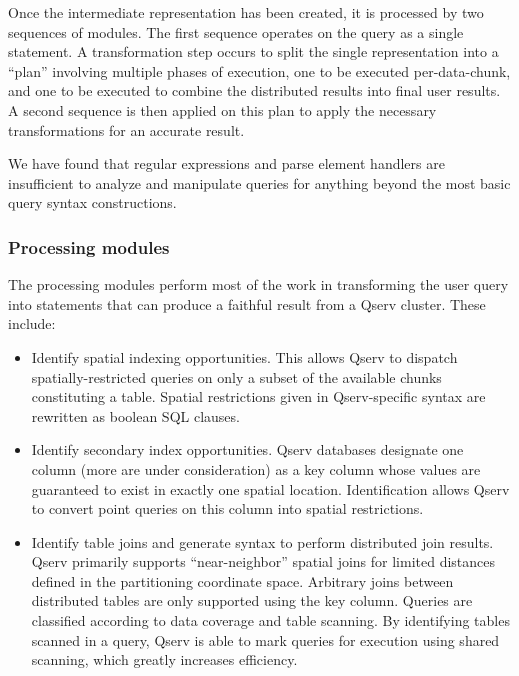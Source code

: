 \documentclass[DM,toc]{lsstdoc}
\begin{document}
Once the intermediate representation has been created, it is processed by two
sequences of modules. The first sequence operates on the query as a single
statement. A transformation step occurs to split the single representation
into a ``plan'' involving multiple phases of execution, one to be executed
per-data-chunk, and one to be executed to combine the distributed results
into final user results. A second sequence is then applied on this plan to
apply the necessary transformations for an accurate result.

We have found that regular expressions and parse element handlers are
insufficient to analyze and manipulate queries for anything beyond the
most basic query syntax constructions.

\subsubsection{Processing modules}\label{processing-modules}

The processing modules perform most of the work in transforming the user
query into statements that can produce a faithful result from a Qserv
cluster. These include:

\begin{itemize}
\item
  Identify spatial indexing opportunities. This allows Qserv to dispatch
  spatially-restricted queries on only a subset of the available chunks
  constituting a table. Spatial restrictions given in Qserv-specific
  syntax are rewritten as boolean SQL clauses.
\item
  Identify secondary index opportunities. Qserv databases designate one
  column (more are under consideration) as a key column whose values
  are guaranteed to exist in exactly one spatial location. Identification
  allows Qserv to convert point queries on this column into spatial
  restrictions.
\item
  Identify table joins and generate syntax to perform distributed join
  results. Qserv primarily supports ``near-neighbor'' spatial joins for
  limited distances defined in the partitioning coordinate space.
  Arbitrary joins between distributed tables are only supported using
  the key column. Queries are classified according to data coverage and table
  scanning. By identifying tables scanned in a query, Qserv is able to
  mark queries for execution using shared scanning, which greatly
  increases efficiency.
\end{itemize}
\end{document}
